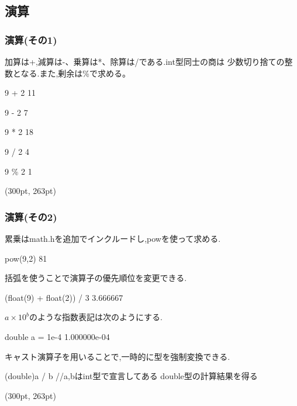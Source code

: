 \documentclass[dvipdfmx]{beamer}
\begin{document}
\subsection{演算}
\begin{frame}[t,fragile]
    \frametitle{演算(その1)}
    加算は+,減算は-、乗算は*、除算は/である.int型同士の商は
    少数切り捨ての整数となる.また,剰余は\%で求める。
    \begin{block}{9 + 2}
        11
    \end{block}
    \begin{block}{9 - 2}
        7
    \end{block}
    \begin{block}{9 * 2}
        18  
    \end{block}
    \begin{block}{9 / 2}
        4   
    \end{block}
    \begin{block}{9 \% 2}
        1   
    \end{block}
    \begin{textblock*}{0.3\linewidth}(300pt, 263pt)
    \space
    \end{textblock*}
\end{frame}

\begin{frame}[t]
    \frametitle{演算(その2)}
    累乗はmath.hを追加でインクルードし,powを使って求める.
    \begin{block}{pow(9,2)}
        81
    \end{block}
    括弧を使うことで演算子の優先順位を変更できる.
    \begin{block}{(float(9) + float(2)) / 3}
        3.666667
    \end{block}
    $a\times 10^{b}$のような指数表記は次のようにする.
    \begin{block}{double a = 1e-4}
        1.000000e-04
    \end{block}
    キャスト演算子を用いることで,一時的に型を強制変換できる.
    \begin{block}{(double)a / b //a,bはint型で宣言してある}
        double型の計算結果を得る
    \end{block}
    \begin{textblock*}{0.3\linewidth}(300pt, 263pt)
    \space
    \end{textblock*}
\end{frame}
\end{document}
